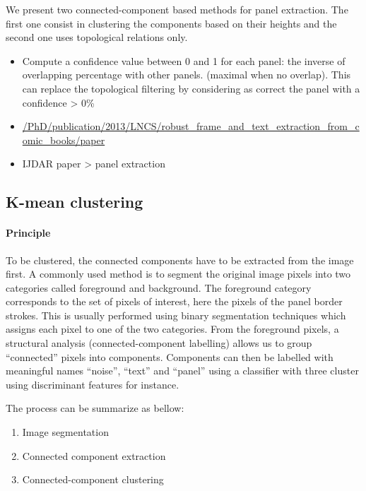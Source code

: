 We present two connected-component based methods for panel extraction.
The first one consist in clustering the components based on their heights and the second one uses topological relations only.

\begin{itemize}
	\item Compute a confidence value between 0 and 1 for each panel: the inverse of overlapping percentage with other panels. (maximal when no overlap). This can replace the topological filtering by considering as correct the panel with a confidence > 0\%
	\item \url{/PhD/publication/2013/LNCS/robust_frame_and_text_extraction_from_comic_books/paper}
	\item IJDAR paper > panel extraction %
\end{itemize}

\subsection{K-mean clustering} %
\label{sub:k_mean_clustering}

\paragraph{Principle} %
\label{par:principle}

To be clustered, the connected components have to be extracted from the image first.
A commonly used method is to segment the original image pixels into two categories called foreground and background.
The foreground category corresponds to the set of pixels of interest, here the pixels of the panel border strokes.
This is usually performed using binary segmentation techniques which assigns each pixel to one of the two categories.
From the foreground pixels, a structural analysis (connected-component labelling) allows us to group ``connected'' pixels into components.
Components can then be labelled with meaningful names ``noise'', ``text'' and ``panel'' using a classifier with three cluster using discriminant features for instance.

The process can be summarize as bellow:
  \begin{enumerate}
	\item Image segmentation
	\item Connected component extraction
	\item Connected-component clustering
  \end{enumerate}


